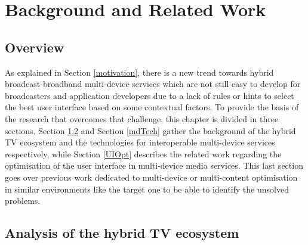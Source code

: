\chapter{Background and Related Work}
\label{chap:sota}

\section{Overview}
As explained in Section \ref{motivation}, there is a new trend towards hybrid broadcast-broadband multi-device services which are not still easy to develop for broadcasters and application developers due to a lack of rules or hints to select the best user interface based on some contextual factors. To provide the basis of the research that overcomes that challenge, this chapter is divided in three sections. Section \ref{hybridEc} and Section \ref{mdTech} gather the background of the hybrid TV ecosystem and the technologies for interoperable multi-device services respectively, while Section \ref{UIOpt} describes the related work regarding the optimisation of the user interface in multi-device media services. This last section goes over previous work dedicated to multi-device or multi-content optimisation in similar environments like the target one to be able to identify the unsolved problems. 
\section{Analysis of the hybrid TV ecosystem}\label{hybridEc}

